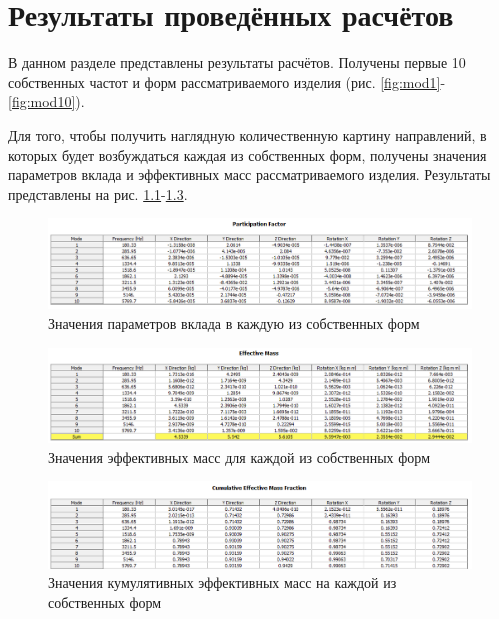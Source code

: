 \chapter{Результаты проведённых расчётов} \label{ch3}


В данном разделе представлены результаты расчётов. Получены первые 10 собственных частот и форм рассматриваемого изделия (рис. \ref{fig:mod1}-\ref{fig:mod10}).

Для того, чтобы получить наглядную количественную картину направлений, в которых будет возбуждаться каждая из собственных форм, получены значения параметров вклада и эффективных масс рассматриваемого изделия. Результаты представлены на рис. \ref{fig:part-factor}-\ref{fig:cum-effective-mass}.

\begin{figure}[H] 
	\center
	\includegraphics[width=\textwidth]{images/part-factor.png}
	\caption{Значения параметров вклада в каждую из собственных форм}
	\label{fig:part-factor}
\end{figure}

\begin{figure}[H] 
	\center
	\includegraphics[width=\textwidth]{images/effective-mass.png}
	\caption{Значения эффективных масс для каждой из собственных форм}
	\label{fig:effective-mass}
\end{figure}

\begin{figure}[H] 
	\center
	\includegraphics[width=\textwidth]{images/cum-effective-mass.png}
	\caption{Значения кумулятивных эффективных масс на каждой из собственных форм}
	\label{fig:cum-effective-mass}
\end{figure}


